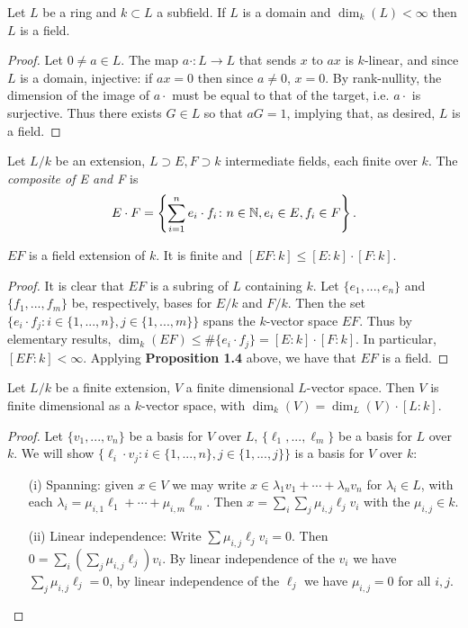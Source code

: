\begin{prop}
Let $L$ be a ring and $k \subset L$ a subfield. If $L$ is a domain and $\dim_k(L) < \infty$ then $L$ is a field.
\end{prop}
\begin{proof}
Let $0 \neq a \in L$. The map $a \cdot \colon L \rightarrow L$ that sends $x$ to $ax$ is $k$-linear, and since $L$ is a domain, injective: if $ax = 0$ then since $a \neq 0$, $x = 0$. By rank-nullity, the dimension of the image of $a \cdot$ must be equal to that of the target, i.e. $a \cdot$ is surjective. Thus there exists $G \in L$ so that $aG = 1$, implying that, as desired, $L$ is a field.
\end{proof}

\begin{defn}
Let $L/k$ be an extension, $L \supset E, F \supset k$ intermediate fields, each finite over $k$. The \textit{composite of E and F} is 
\[E \cdot F = \left\{ \sum_{i = 1}^n e_i \cdot f_i \colon n \in \mathbb{N}, e_i \in E, f_i \in F \right\}.\]
\end{defn}

\begin{prop}
$EF$ is a field extension of $k$. It is finite and $[EF : k] \leq [E : k] \cdot [F : k]$.
\end{prop}
\begin{proof}
It is clear that $EF$ is a subring of $L$ containing $k$. Let $\{e_1, ..., e_n\}$ and $\{f_1, ..., f_m\}$ be, respectively, bases for $E/k$ and $F/k$. Then the set $\{e_i \cdot f_j \colon i \in \{1, ..., n\}, j \in \{1, ..., m\}\}$ spans the $k$-vector space $EF$. Thus by elementary results, $\dim_k(EF) \leq \#\{e_i \cdot f_j\} = [E : k] \cdot [F : k]$. In particular, $[EF : k] < \infty$. Applying \textbf{Proposition 1.4} above, we have that $EF$ is a field.
\end{proof}

\begin{prop}
Let $L/k$ be a finite extension, $V$ a finite dimensional $L$-vector space. Then $V$ is finite dimensional as a $k$-vector space, with $\dim_k(V) = \dim_L(V) \cdot [L : k]$.
\end{prop}
\begin{proof}
Let $\{v_1, ..., v_n\}$ be a basis for $V$ over $L$, $\{\ell_1, ..., \ell_m\}$ be a basis for $L$ over $k$. We will show $\{\ell_i \cdot v_j \colon i \in \{1, ..., n\}, j \in \{1, ..., j\}\}$ is a basis for $V$ over $k$:
\begin{enumerate}
\item[(i)] Spanning: given $x \in V$ we may write $x \in \lambda_1v_1 + \cdots + \lambda_nv_n$ for $\lambda_i \in L$, with each $\lambda_i = \mu_{i,1}\ell_1 + \cdots + \mu_{i,m}\ell_m$. Then $x = \sum_i \sum_j \mu_{i, j} \ell_j v_i$ with the $\mu_{i,j} \in k$.
\item[(ii)] Linear independence: Write $\sum \mu_{i,j} \ell_j v_i = 0$. Then $0 = \sum_i \left( \sum_j\mu_{i,j} \ell_j \right) v_i$. By linear independence of the $v_i$ we have $\sum_j\mu_{i,j} \ell_j = 0$, by linear independence of the $\ell_j$ we have $\mu_{i,j} = 0$ for all $i,j$.
\end{enumerate}
\end{proof}

